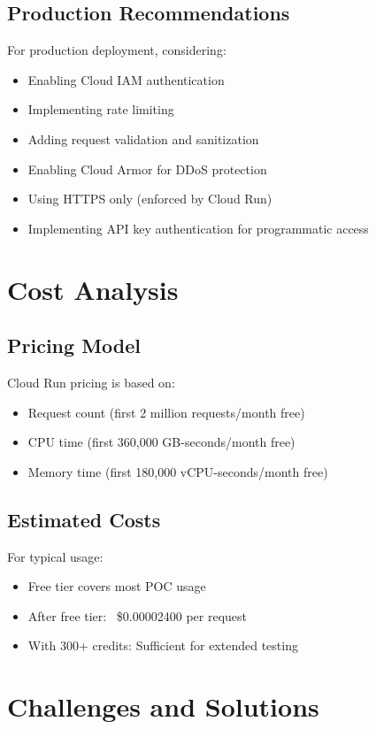 \documentclass[12pt,a4paper]{article}
\begin{document}
\subsection{Production Recommendations}
For production deployment, considering:
\begin{itemize}
    \item Enabling Cloud IAM authentication
    \item Implementing rate limiting
    \item Adding request validation and sanitization
    \item Enabling Cloud Armor for DDoS protection
    \item Using HTTPS only (enforced by Cloud Run)
    \item Implementing API key authentication for programmatic access
\end{itemize}

\section{Cost Analysis}

\subsection{Pricing Model}
Cloud Run pricing is based on:
\begin{itemize}
    \item Request count (first 2 million requests/month free)
    \item CPU time (first 360,000 GB-seconds/month free)
    \item Memory time (first 180,000 vCPU-seconds/month free)
\end{itemize}

\subsection{Estimated Costs}
For typical usage:
\begin{itemize}
    \item Free tier covers most POC usage
    \item After free tier: ~\$0.00002400 per request
    \item With 300+ credits: Sufficient for extended testing
\end{itemize}

\section{Challenges and Solutions}
\end{document}
